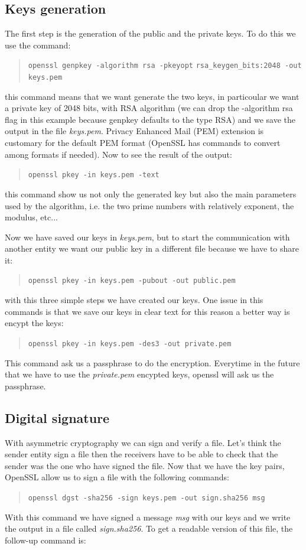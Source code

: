 \documentclass[11pt]{article}
\begin{document}
\subsection{Keys generation}
The first step is the generation of the public and the private keys. To do this we use the command:
\begin{quote}
  \verb|openssl genpkey -algorithm rsa -pkeyopt|\newline
  \verb|rsa_keygen_bits:2048 -out keys.pem|
\end{quote}
this command means that we want generate the two keys, in particoular we want a private key of 2048 bits, with RSA algorithm (we can drop the -algorithm rsa flag in this example because genpkey defaults to the type RSA) and we save the output in the file {\em keys.pem}. Privacy Enhanced Mail (PEM) extension is customary for the default PEM format (OpenSSL has commands to convert among formats if needed). Now to see the result of the output:
\begin{quote}
  \verb|openssl pkey -in keys.pem -text|
\end{quote}
this command show us not only the generated key but also the main parameters used by the algorithm, i.e. the two prime numbers with relatively exponent, the modulus, etc...

Now we have saved our keys in {\em keys.pem}, but to start the communication with another entity we want our public key in a different file because we have to share it:
\begin{quote}
  \verb|openssl pkey -in keys.pem -pubout -out public.pem|
\end{quote}
with this three simple steps we have created our keys. One issue in this commands is that we save our keys in clear text for this reason a better way is encypt the keys:
\begin{quote}
  \verb|openssl pkey -in keys.pem -des3 -out private.pem|
\end{quote}
This command ask us a passphrase to do the encryption. Everytime in the future that we have to use the {\em private.pem} encypted keys, openssl will ask us the passphrase.

\subsection{Digital signature}
With asymmetric cryptography we can sign and verify a file. Let's think the sender entity sign a file then the receivers have to be able to check that the sender was the one who have signed the file. Now that we have the key pairs, OpenSSL allow us to sign a file with the following commands:
\begin{quote}
  \verb|openssl dgst -sha256 -sign keys.pem -out sign.sha256 msg|
\end{quote}
With this command we have signed a message {\em msg} with our keys and we write the output in a file called {\em sign.sha256}. To get a readable version of this file, the follow-up command is:
\end{document}
